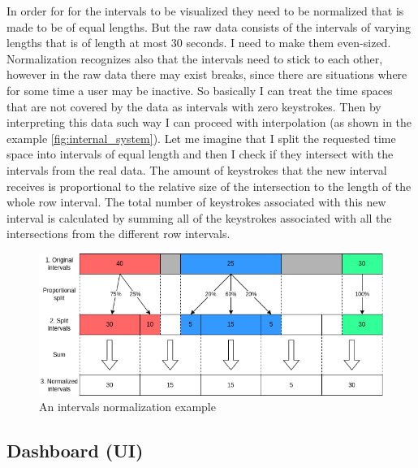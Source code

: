 In order for for the intervals to be visualized they need to be normalized that is made to be of equal lengths. But the raw data consists of the intervals of varying lengths that is of length at most 30 seconds. I need to make them even-sized.
Normalization recognizes also that the intervals need to stick to each other, however in the raw data there may exist breaks, since there are situations where for some time a user may be inactive.
So basically I can treat the time spaces that are not covered by the data as intervals with zero keystrokes. Then by interpreting this data such way I can proceed with interpolation (as shown in the example \ref{fig:internal_system}).
Let me imagine that I split the requested time space into intervals of equal length and then I check if they intersect with the intervals from the real data. The amount of keystrokes that the new interval receives is proportional to the relative size of the intersection to the length of the whole row interval.
The total number of keystrokes associated with this new interval is calculated by summing all of the keystrokes associated with all the intersections from the different row intervals.

\begin{figure}[htbp]
  \centering
  \includegraphics[scale=0.5]{chapters/methodology/graphics/normalization.png}
  \caption{An intervals normalization example}
  \label{fig:normalization_example}
\end{figure}

\subsection{Dashboard (UI)}

